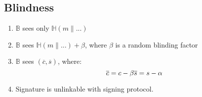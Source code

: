 \documentclass{report}
\begin{document}
\begin{adjustwidth}{2em}{2em}
	\subsection{Blindness}
	\begin{adjustwidth}{2em}{}
		\begin{enumerate}[-]
			\item $\mathbb{B}$ sees only $\mathbb{H}(m \| ...)$
			\item $\mathbb{B}$ sees $\mathbb{H}(m \| ...) + \beta$, where $\beta$ is a random blinding factor
			\item $\mathbb{B}$ sees $(\overline{c}, \overline{s})$, where:
			\[
				\overline{c} = c - \beta $$$$
				\overline{s} = s - \alpha
			\]
			\item Signature is unlinkable with signing protocol.
		\end{enumerate}
	\end{adjustwidth}
\end{adjustwidth}
\end{document}
